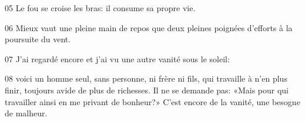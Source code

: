 
05 Le fou se croise les bras: il consume sa propre vie.

06 Mieux vaut une pleine main de repos que deux pleines poignées d’efforts à la poursuite du vent.

07 J’ai regardé encore et j’ai vu une autre vanité sous le soleil:

08 voici un homme seul, sans personne, ni frère ni fils, qui travaille à n’en plus finir, toujours avide de plus de richesses. Il ne se demande pas: «Mais pour qui travailler ainsi en me privant de bonheur?» C’est encore de la vanité, une besogne de malheur.
